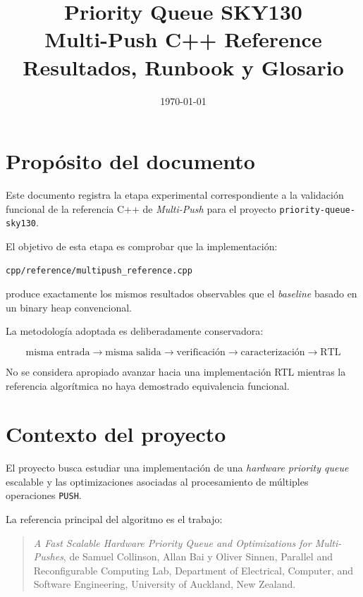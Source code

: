 \documentclass[11pt,a4paper]{article}
\title{
    \textbf{Priority Queue SKY130}\\
    \large Multi-Push C++ Reference\\
    Resultados, Runbook y Glosario
}
\author{}
\date{\today}
\begin{document}
\maketitle

\tableofcontents
\newpage

\section{Propósito del documento}

Este documento registra la etapa experimental correspondiente a la
validación funcional de la referencia C++ de \emph{Multi-Push} para el
proyecto \texttt{priority-queue-sky130}.

El objetivo de esta etapa es comprobar que la implementación:

\begin{lstlisting}[style=textfile]
cpp/reference/multipush_reference.cpp
\end{lstlisting}

produce exactamente los mismos resultados observables que el
\emph{baseline} basado en un binary heap convencional.

La metodología adoptada es deliberadamente conservadora:

\[
\boxed{
\text{misma entrada}
\rightarrow
\text{misma salida}
\rightarrow
\text{verificación}
\rightarrow
\text{caracterización}
\rightarrow
\text{RTL}
}
\]

No se considera apropiado avanzar hacia una implementación RTL mientras
la referencia algorítmica no haya demostrado equivalencia funcional.

\section{Contexto del proyecto}

El proyecto busca estudiar una implementación de una \emph{hardware
priority queue} escalable y las optimizaciones asociadas al procesamiento
de múltiples operaciones \texttt{PUSH}.

La referencia principal del algoritmo es el trabajo:

\begin{quote}
\emph{A Fast Scalable Hardware Priority Queue and Optimizations for
Multi-Pushes}, de Samuel Collinson, Allan Bai y Oliver Sinnen,
Parallel and Reconfigurable Computing Lab, Department of Electrical,
Computer, and Software Engineering, University of Auckland, New Zealand.
\end{quote}
\end{document}
